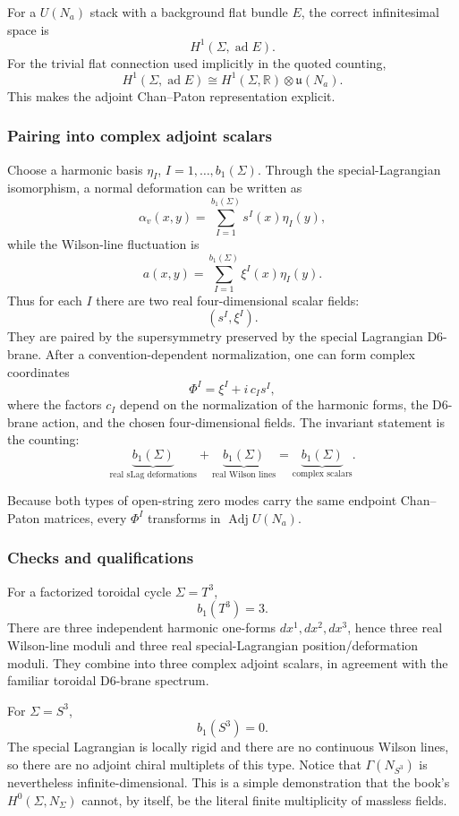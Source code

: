 \documentclass[
  10pt,
  a4paper,
  openany]{book}
\begin{document}
For a \(U(N_a)\) stack with a background flat bundle \(E\), the correct
infinitesimal space is \[
H^1(\Sigma,\operatorname{ad}E).
\] For the trivial flat connection used implicitly in the quoted
counting, \[
H^1(\Sigma,\operatorname{ad}E)
\cong
H^1(\Sigma,\mathbb R)\otimes\mathfrak u(N_a).
\] This makes the adjoint Chan--Paton representation explicit.

\subsubsection{Pairing into complex adjoint
scalars}\label{pairing-into-complex-adjoint-scalars}

Choose a harmonic basis \(\eta_I\), \(I=1,\ldots,b_1(\Sigma)\). Through
the special-Lagrangian isomorphism, a normal deformation can be written
as \[
\alpha_v(x,y)
=\sum_{I=1}^{b_1(\Sigma)}s^I(x)\eta_I(y),
\] while the Wilson-line fluctuation is \[
a(x,y)
=\sum_{I=1}^{b_1(\Sigma)}\xi^I(x)\eta_I(y).
\] Thus for each \(I\) there are two real four-dimensional scalar
fields: \[
(s^I,\xi^I).
\] They are paired by the supersymmetry preserved by the special
Lagrangian D6-brane. After a convention-dependent normalization, one can
form complex coordinates \[
\Phi^I=\xi^I+i\,c_I s^I,
\] where the factors \(c_I\) depend on the normalization of the harmonic
forms, the D6-brane action, and the chosen four-dimensional fields. The
invariant statement is the counting: \[
\underbrace{b_1(\Sigma)}_{\text{real sLag deformations}}
+
\underbrace{b_1(\Sigma)}_{\text{real Wilson lines}}
=
\underbrace{b_1(\Sigma)}_{\text{complex scalars}}.
\]

Because both types of open-string zero modes carry the same endpoint
Chan--Paton matrices, every \(\Phi^I\) transforms in
\(\operatorname{Adj}U(N_a)\).

\subsubsection{Checks and
qualifications}\label{checks-and-qualifications}

For a factorized toroidal cycle \(\Sigma=T^3\), \[
b_1(T^3)=3.
\] There are three independent harmonic one-forms \(dx^1,dx^2,dx^3\),
hence three real Wilson-line moduli and three real special-Lagrangian
position/deformation moduli. They combine into three complex adjoint
scalars, in agreement with the familiar toroidal D6-brane spectrum.

For \(\Sigma=S^3\), \[
b_1(S^3)=0.
\] The special Lagrangian is locally rigid and there are no continuous
Wilson lines, so there are no adjoint chiral multiplets of this type.
Notice that \(\Gamma(N_{S^3})\) is nevertheless infinite-dimensional.
This is a simple demonstration that the book's \(H^0(\Sigma,N_\Sigma)\)
cannot, by itself, be the literal finite multiplicity of massless
fields.
\end{document}
